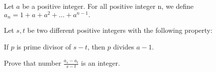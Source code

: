 Let $a$ be a positive integer. For all positive integer n, we define $ a_n=1+a+a^2+\ldots+a^{n-1}. $

Let $s,t$ be two different positive integers with the following property:

If $p$ is prime divisor of $s-t$,  then  $p$ divides  $a-1$.

Prove that number $\frac{a_{s}-a_{t}}{s-t}$ is an integer.
